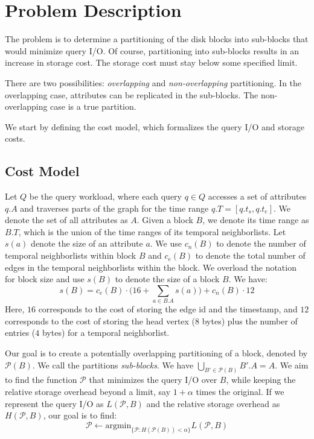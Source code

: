 



\section{Problem Description}

The problem is to determine a partitioning of the disk blocks into sub-blocks
that would minimize query I/O. Of course, partitioning into sub-blocks results
in an increase in storage cost. The storage cost must stay below some
specified limit.

There are two possibilities: \emph{overlapping} and \emph{non-overlapping}
partitioning. In the overlapping case, attributes can be replicated in the
sub-blocks. The non-overlapping case is a true partition.

We start by defining the cost model, which formalizes the query I/O and storage
costs.

\subsection{Cost Model}
Let $Q$ be the query workload, where each query $q\in Q$ accesses a set of
attributes $q.A$ and traverses parts of the graph for the time range
$q.T=[q.t_s,q.t_e]$. We denote the set of all attributes as $A$. Given a block
$B$, we denote its time range as $B.T$, which is the union of the time ranges
of its temporal neighborlists. Let $s(a)$ denote the size of an attribute $a$.
We use $c_n(B)$ to denote the number of temporal neighborlists within block
$B$ and $c_e(B)$ to denote the total number of edges in the temporal
neighborlists within the block. We overload the notation for block size and
use $s(B)$ to denote the size of a block $B$. We have: 
\begin{equation}
s(B) = c_e(B) \cdot \Big(16 + \sum_{a\in B.A} s(a)\Big) + c_n(B) \cdot 12  
\end{equation}
Here, $16$ corresponds to the cost of storing the edge id and the timestamp,
and $12$ corresponds to the cost of storing the head vertex ($8$ bytes) plus
the number of entries ($4$ bytes) for a temporal neighborlist. 

Our goal is to create a potentially overlapping partitioning of a block,
denoted by $\mathcal{P}(B)$. We call the partitions \emph{sub-blocks}. We have
$\bigcup_{B'\in \mathcal{P}(B)} B'.A = A$. We aim to find the function
$\mathcal{P}$ that minimizes the query I/O over $B$, while keeping the
relative storage overhead beyond a limit, say $1+\alpha$ times the original.
If we represent the query I/O as $L(\mathcal{P}, B)$ and the relative storage
overhead as $H(\mathcal{P}, B)$, our goal is to find:
\begin{equation}
\mathcal{P} \leftarrow \mbox{argmin}_{\{\mathcal{P}: H(\mathcal{P}(B)) < \alpha\}} L(\mathcal{P},B)
\end{equation}

